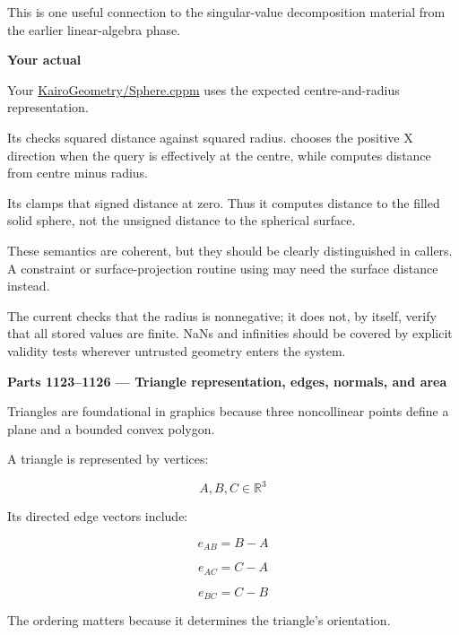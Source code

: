 This is one useful connection to the singular-value decomposition material from the earlier linear-algebra phase.

\textbf{Your actual }

Your \href{https://github.com/swayam8624/KairoGeometry/blob/master/Sphere.cppm?utm_source=chatgpt.com}{KairoGeometry/Sphere.cppm} uses the expected centre-and-radius representation.

Its  checks squared distance against squared radius.  chooses the positive X direction when the query is effectively at the centre, while  computes distance from centre minus radius.

Its  clamps that signed distance at zero. Thus it computes distance to the filled solid sphere, not the unsigned distance to the spherical surface.

These semantics are coherent, but they should be clearly distinguished in callers. A constraint or surface-projection routine using  may need the surface distance instead.

The current  checks that the radius is nonnegative; it does not, by itself, verify that all stored values are finite. NaNs and infinities should be covered by explicit validity tests wherever untrusted geometry enters the system.

\textbf{Parts 1123--1126 --- Triangle representation, edges, normals, and area}

Triangles are foundational in graphics because three noncollinear points define a plane and a bounded convex polygon.

A triangle is represented by vertices:

\[
A,B,C\in\mathbb R^3
\]

Its directed edge vectors include:

\[
e_{AB}=B-A
\]

\[
e_{AC}=C-A
\]

\[
e_{BC}=C-B
\]

The ordering matters because it determines the triangle's orientation.


